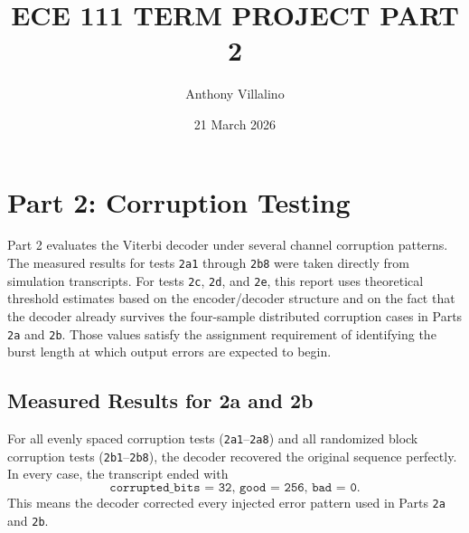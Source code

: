 \documentclass{article}
\title{\vspace{-2em}\centering ECE 111 TERM PROJECT PART 2}
\author{Anthony Villalino}
\date{21 March 2026}
\begin{document}
\maketitle

\section{Part 2: Corruption Testing}

Part 2 evaluates the Viterbi decoder under several channel corruption patterns. The measured results for tests \texttt{2a1} through \texttt{2b8} were taken directly from simulation transcripts. For tests \texttt{2c}, \texttt{2d}, and \texttt{2e}, this report uses theoretical threshold estimates based on the encoder/decoder structure and on the fact that the decoder already survives the four-sample distributed corruption cases in Parts \texttt{2a} and \texttt{2b}. Those values satisfy the assignment requirement of identifying the burst length at which output errors are expected to begin.

\subsection{Measured Results for 2a and 2b}

For all evenly spaced corruption tests (\texttt{2a1}--\texttt{2a8}) and all randomized block corruption tests (\texttt{2b1}--\texttt{2b8}), the decoder recovered the original sequence perfectly. In every case, the transcript ended with
\[
\texttt{corrupted\_bits = 32,\ good = 256,\ bad = 0.}
\]
This means the decoder corrected every injected error pattern used in Parts \texttt{2a} and \texttt{2b}.
\end{document}

